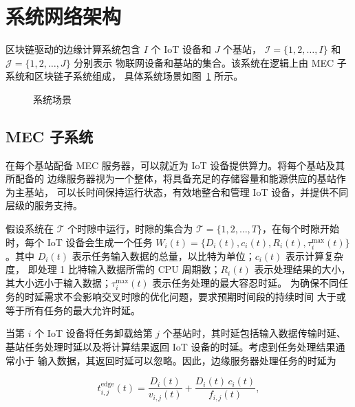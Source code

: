 \section{系统网络架构}

区块链驱动的边缘计算系统包含 $I$ 个 IoT 设备和 $J$ 个基站，
$\mathcal{I}=\{1,2,\dots,I\}$ 和 $\mathcal{J}=\{1,2,\dots,J\}$ 分别表示
物联网设备和基站的集合。该系统在逻辑上由 MEC 子系统和区块链子系统组成，
具体系统场景如图~\ref{fig:scene} 所示。

\begin{figure}[H]
  \centering
  \caption{系统场景}
  \label{fig:scene}
\end{figure}

\subsection{MEC 子系统}

在每个基站配备 MEC 服务器，可以就近为 IoT 设备提供算力。将每个基站及其所配备的
边缘服务器视为一个整体，将具备充足的存储容量和能源供应的基站作为主基站，
可以长时间保持运行状态，有效地整合和管理 IoT 设备，并提供不同层级的服务支持。

假设系统在 $\mathcal{T}$ 个时隙中运行，时隙的集合为
$\mathcal{T}=\{1,2,\dots,T\}$，在每个时隙开始时，每个 IoT 设备会生成一个任务
$W_{i}(t)=\{D_{i}(t), c_{i}(t), R_{i}(t), \tau_{i}^{\max}(t)\}$。其中
$D_{i}(t)$ 表示任务输入数据的总量，以比特为单位；$c_{i}(t)$ 表示计算复杂度，
即处理 1 比特输入数据所需的 CPU 周期数；$R_{i}(t)$ 表示处理结果的大小，
其大小远小于输入数据；$\tau_{i}^{\max}(t)$ 表示任务处理的最大容忍时延。
为确保不同任务的时延需求不会影响交叉时隙的优化问题，要求预期时间段的持续时间
大于或等于所有任务的最大允许时延。

当第 $i$ 个 IoT 设备将任务卸载给第 $j$ 个基站时，其时延包括输入数据传输时延、
基站任务处理时延以及将计算结果返回 IoT 设备的时延。考虑到任务处理结果通常小于
输入数据，其返回时延可以忽略。因此，边缘服务器处理任务的时延为

\begin{equation}
  t_{i,j}^{\mathrm{edge}}(t)
  = \frac{D_{i}(t)}{v_{i,j}(t)}
  + \frac{D_{i}(t)\, c_{i}(t)}{f_{i,j}(t)},
\end{equation}

